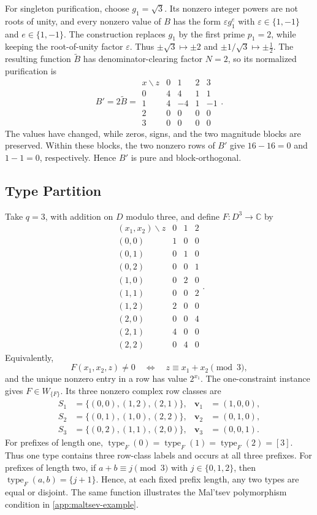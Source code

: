 \documentclass[11pt,letterpaper,onecolumn]{article}
\theoremstyle{plain}
\theoremstyle{definition}
\theoremstyle{remark}
\newcommand{\AlgNums}{\mathbb C}
\DeclareMathOperator{\typeop}{type}
\begin{document}
For singleton purification, choose $g_1=\sqrt3$.  Its nonzero integer
powers are not roots of unity, and every nonzero value of $B$ has the form
$\varepsilon g_1^e$ with $\varepsilon\in\{1,-1\}$ and $e\in\{1,-1\}$.
The construction replaces $g_1$ by the first prime $p_1=2$, while keeping
the root-of-unity factor $\varepsilon$.  Thus
$\pm\sqrt3\mapsto\pm2$ and $\pm1/\sqrt3\mapsto\pm\tfrac12$.
The resulting function $\widetilde B$ has denominator-clearing factor
$N=2$, so its normalized purification is
\[
B'=2\widetilde B=
\begin{array}{c|rrrr}
  x\backslash z&0&1&2&3\\ \hline
  0&4&4&1&1\\
  1&4&-4&1&-1\\
  2&0&0&0&0\\
  3&0&0&0&0
\end{array}.
\]
The values have changed, while zeros, signs, and the two magnitude blocks
are preserved.  Within these blocks, the two nonzero rows of $B'$ give
$16-16=0$ and $1-1=0$, respectively.  Hence $B'$ is pure and
block-orthogonal.

\subsection{Type Partition}
\label{app:type-partition-example}

Take $q=3$, with addition on $D$ modulo three, and define
$F:D^3\to\AlgNums$ by
\[
\begin{array}{c|rrr}
  (x_1,x_2)\backslash z&0&1&2\\ \hline
  (0,0)&1&0&0\\
  (0,1)&0&1&0\\
  (0,2)&0&0&1\\
  (1,0)&0&2&0\\
  (1,1)&0&0&2\\
  (1,2)&2&0&0\\
  (2,0)&0&0&4\\
  (2,1)&4&0&0\\
  (2,2)&0&4&0
\end{array}.
\]
Equivalently,
\begin{equation}
  F(x_1,x_2,z)\ne0
  \quad\Longleftrightarrow\quad
  z\equiv x_1+x_2\pmod 3,
  \label{eq:type-example-modular-support}
\end{equation}
and the unique nonzero entry in a row has value $2^{x_1}$.
The one-constraint instance gives $F\in W_{\{F\}}$.  Its three nonzero
complex row classes are
\[
\begin{aligned}
  S_1&=\{(0,0),(1,2),(2,1)\},& \mathbf v_1&=(1,0,0),\\
  S_2&=\{(0,1),(1,0),(2,2)\},& \mathbf v_2&=(0,1,0),\\
  S_3&=\{(0,2),(1,1),(2,0)\},& \mathbf v_3&=(0,0,1).
\end{aligned}
\]
For prefixes of length one, $\typeop_F(0)=\typeop_F(1)=\typeop_F(2)=[3]$. Thus one type contains three row-class labels and occurs at all three
prefixes.  For prefixes of length two, if $a+b\equiv j\pmod3$ with
$j\in\{0,1,2\}$, then $\typeop_F(a,b)=\{j+1\}$. Hence, at each fixed prefix length, any two types are equal or disjoint.
The same function illustrates the Mal'tsev polymorphism condition in
\cref{app:maltsev-example}.
\end{document}

